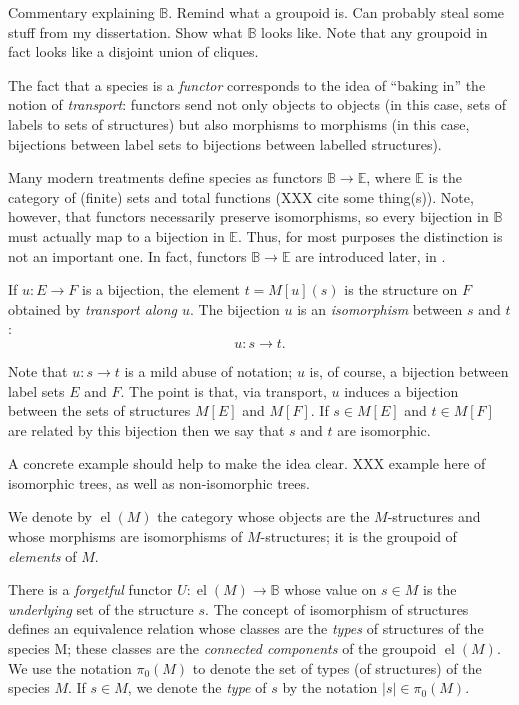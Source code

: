 \documentclass{article}
\theoremstyle{definition}
\theoremstyle{remark}
\newcommand{\B}{\mathbb{B}}
\newcommand{\E}{\mathbb{E}}
\DeclareMathOperator{\el}{el}
\newcommand{\term}[1]{\emph{#1}}
\newcommand{\pref}[1]{\prettyref{#1}}
\begin{document}
\begin{commentary}
  Commentary explaining $\B$.  Remind what a groupoid is.  Can
  probably steal some stuff from my dissertation.  Show what $\B$
  looks like.  Note that any groupoid in fact looks like a disjoint
  union of cliques.

  The fact that a species is a \emph{functor} corresponds to the idea
  of ``baking in'' the notion of \emph{transport}: functors send not
  only objects to objects (in this case, sets of labels to sets of
  structures) but also morphisms to morphisms (in this case,
  bijections between label sets to bijections between labelled
  structures).

  Many modern treatments define species as functors $\B \to \E$, where
  $\E$ is the category of (finite) sets and total functions (XXX cite
  some thing(s)).  Note, however, that functors necessarily preserve
  isomorphisms, so every bijection in $\B$ must actually map to a
  bijection in $\E$.  Thus, for most purposes the distinction is not
  an important one.  In fact, functors $\B \to \E$ are introduced
  later, in \pref{sec:category-of-species}.
\end{commentary}

If $u: E \to F$ is a bijection, the element $t = M [u] (s)$ is the
structure on $F$ obtained by \term{transport along $u$}. The bijection
$u$ is an \term{isomorphism} between $s$ and $t$:
\[ u : s \to t. \]
\begin{commentary}
  Note that $u : s \to t$ is a mild abuse of notation; $u$ is, of
  course, a bijection between label sets $E$ and $F$.  The point is
  that, via transport, $u$ induces a bijection between the sets of
  structures $M[E]$ and $M[F]$.  If $s \in M[E]$ and $t \in M[F]$ are
  related by this bijection then we say that $s$ and $t$ are
  isomorphic.

  A concrete example should help to make the idea clear.  XXX example
  here of isomorphic trees, as well as non-isomorphic trees.
\end{commentary}
We denote by $\el (M)$ the category whose objects are the $M$-structures and
whose morphisms are isomorphisms of $M$-structures; it is the
groupoid of \term{elements} of $M$.

There is a \term{forgetful}
functor $U: \el (M) \to \B$ whose
value on $s \in M$ is the \term{underlying} set of the structure $s$. The concept
of isomorphism of structures defines an equivalence relation whose
classes are the \term{types} of structures of the species M; these classes are
the \term{connected components} of the groupoid $\el (M)$. We use the notation
$\pi_0 (M)$ to denote the set of types (of structures) of the species $M$. If
$s \in M$, we denote the \term{type} of $s$ by the notation $|s| \in \pi_0 (M)$.
\end{document}
